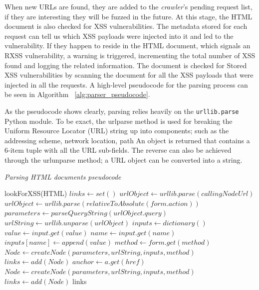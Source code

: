 When new URLs are found, they are added to the \emph{crawler}'s pending request list, if they are interesting they will be fuzzed in the future. At this stage, the HTML document is also checked for XSS vulnerabilities. The metadata stored for each request can tell us which XSS payloads were injected into it and led to the vulnerability. If they happen to reside in the HTML document, which signals an RXSS vulnerability, a warning is triggered, incrementing the total number of XSS found and logging the related information. The document is  checked for Stored XSS vulnerabilities by scanning the document for all the XSS payloads that were injected in all the requests. A high-level pseudocode for the parsing process can be seen in Algorithm ~\ref{alg:parser_pseudocode}. 

As the pseudocode shows clearly, parsing relies heavily on the {\tt urllib.parse} ~\cite{urllib_parse} Python module. To be exact, the urlparse method is used for breaking the Uniform Resource Locator (URL) string up into components; such as the addressing scheme, network location, path \etc An object is returned that contains a 6-item tuple with all the URL sub-fields. The reverse can also be achieved through the urlunparse method; a URL object can be converted into a string.

\begin{algorithm}
 
 \caption{\textit{Parsing HTML documents pseudocode}}
 \label{alg:parser_pseudocode}
 
 \begin{algorithmic}
	\STATE lookForXSS(HTML)  
	\STATE $links \leftarrow set()$ 
 			\STATE $urlObject \leftarrow urllib.parse(callingNodeUrl)$
		 \ELSE 
 			\STATE $urlObject \leftarrow urllib.parse(relativeToAbsolute(form.action))$
		 \ENDIF
		\STATE $parameters \leftarrow parseQueryString(urlObject.query)$ 
		\STATE $urlString \leftarrow urllib.unparse(urlObject)$ 
		\STATE $inputs \leftarrow dictionary()$ 
			\STATE $value \leftarrow input.get(value)$			 
	 		\STATE $name \leftarrow input.get(name)$	
	 		\STATE $inputs[name] \leftarrow append(value)$	 
		\ENDFOR
		\STATE $method \leftarrow form.get(method)$	
		\STATE $Node \leftarrow createNode(parameters, urlString, inputs, method)$	
		\STATE $links \leftarrow add(Node)$
			\STATE $anchor \leftarrow a.get(href)$			 
		\ENDFOR
		\STATE $Node \leftarrow createNode(parameters, urlString, inputs, method)$	
		\STATE $links \leftarrow add(Node)$
	\ENDFOR
	\RETURN links
 \end{algorithmic}
\end{algorithm}


